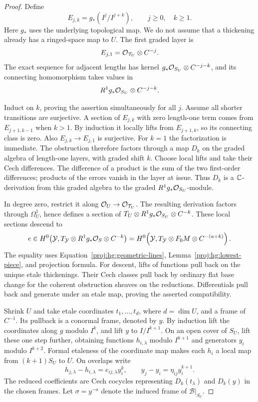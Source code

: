 \begin{proof}
Define
\[
 E_{j,k}=g_*(I^j/I^{j+k}),\qquad j\geq0,\quad k\geq1.
\]
Here \(g_*\) uses the underlying topological map.  We do not
assume that a thickening already has a ringed-space map to \(U\).
The first graded layer is
\[
 E_{j,1}=\mathcal{O}_{\mathcal T_U}\otimes C^{-j}.
\]
The exact sequence for adjacent lengths has kernel
\(g_*\mathcal{O}_{S_U}\otimes C^{-j-k}\), and its connecting homomorphism
takes values in
\[
 R^1g_*\mathcal{O}_{S_U}\otimes C^{-j-k}.
\]

Induct on \(k\), proving the assertion simultaneously for all \(j\).
Assume all shorter transitions are surjective.  A section of
\(E_{j,k}\) with zero length-one term comes from \(E_{j+1,k-1}\)
when \(k>1\).  By induction it locally lifts from \(E_{j+1,k}\),
so its connecting class is zero.  Also \(E_{j,k}\to E_{j,1}\)
is surjective.  For \(k=1\) the factorization is immediate.
The obstruction therefore factors through a map \(D_k\) on the
graded algebra of length-one layers, with graded shift \(k\).
Choose local lifts and take their Cech differences.  The
difference of a product is the sum of the two first-order
differences; products of the errors vanish in the layer at issue.
Thus \(D_k\) is a \(\mathbb{C}\)-derivation from this graded algebra to
the graded \(R^1g_*\mathcal{O}_{S_U}\)-module.

In degree zero, restrict it along
\(\mathcal{O}_U\to\mathcal{O}_{\mathcal T_U}\).  The resulting derivation factors
through \(\Omega_U^1\), hence defines a section of
\(T_U\otimes R^1g_*\mathcal{O}_{S_U}\otimes C^{-k}\).
These local sections descend to
\begin{equation}\label{proj:hg:obstruction-section}
 e\in H^0\!\left(
 \mathcal Y,T_{\mathcal Y}\otimes R^1g_*\mathcal{O}_S\otimes C^{-k}
 \right)
 =
 H^0\!\left(
 \mathcal Y,T_{\mathcal Y}\otimes F_0M\otimes C^{-(a+k)}
 \right).
\end{equation}
The equality uses Equation~\eqref{proj:hg:geometric-lines},
Lemma~\ref{proj:hg:lowest-piece}, and projection formula.
For descent, lifts of functions pull back on the unique etale
thickenings.  Their Cech classes pull back by ordinary flat base
change for the coherent obstruction sheaves on the reductions.
Differentials pull back and generate under an etale map, proving
the asserted compatibility.

Shrink \(U\) and take etale coordinates \(t_1,\ldots,t_d\),
where \(d=\dim U\), and a frame of \(C^{-1}\).  Its pullback is
a conormal frame, denoted by \(y\).  By induction lift the
coordinates along \(g\) modulo \(I^k\), and lift \(y\) to
\(I/I^{k+1}\).  On an open cover of \(S_U\), lift these one step
further, obtaining functions \(h_{i,\lambda}\) modulo \(I^{k+1}\)
and generators \(y_i\) modulo \(I^{k+2}\).  Formal etaleness of
the coordinate map makes each \(h_i\) a local map from
\((k+1)S_U\) to \(U\).  On overlaps write
\begin{equation}\label{proj:hg:coordinate-errors}
 h_{j,\lambda}-h_{i,\lambda}
       =e_{ij,\lambda}y_i^k,
 \qquad
 y_j-y_i=\eta_{ij}y_i^{k+1}.
\end{equation}
The reduced coefficients are Cech cocycles representing
\(D_k(t_\lambda)\) and \(D_k(y)\) in the chosen frames.
Let \(\sigma=y^{-a}\) denote the induced frame of
\(\mathcal B|_{S_U}\).


\end{proof}
